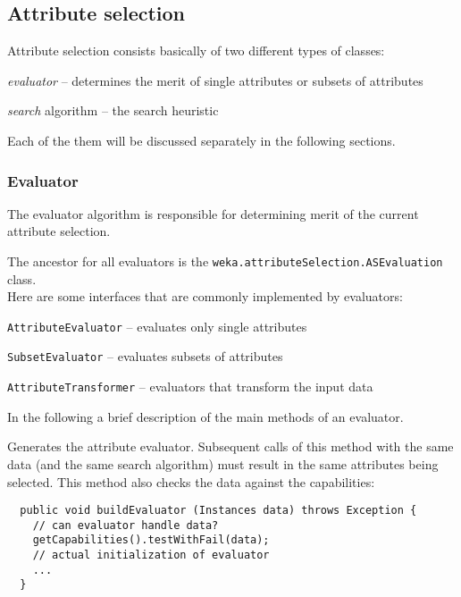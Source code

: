
\newpage
\subsection{Attribute selection}
Attribute selection consists basically of two different types of classes:
\begin{tight_itemize}
  \item \textit{evaluator} -- determines the merit of single attributes or
subsets of attributes
  \item \textit{search} algorithm -- the search heuristic
\end{tight_itemize}
Each of the them will be discussed separately in the following sections.

\subsubsection*{Evaluator}
The evaluator algorithm is responsible for determining merit of the current
attribute selection.

The ancestor for all evaluators is the
\texttt{weka.attributeSelection.ASEvaluation} class. \\

\noindent Here are some interfaces that are commonly implemented by evaluators:
\begin{tight_itemize}
  \item \texttt{AttributeEvaluator} -- evaluates only single attributes
  \item \texttt{SubsetEvaluator} -- evaluates subsets of attributes
  \item \texttt{AttributeTransformer} -- evaluators that transform the input
data
\end{tight_itemize}

In the following a brief description of the main methods of an evaluator.

Generates the attribute evaluator. Subsequent calls of this method with the
same data (and the same search algorithm) must result in the same attributes
being selected. This method also checks the data against the capabilities:
\begin{verbatim}
  public void buildEvaluator (Instances data) throws Exception {
    // can evaluator handle data?
    getCapabilities().testWithFail(data);
    // actual initialization of evaluator
    ...
  }
\end{verbatim}

